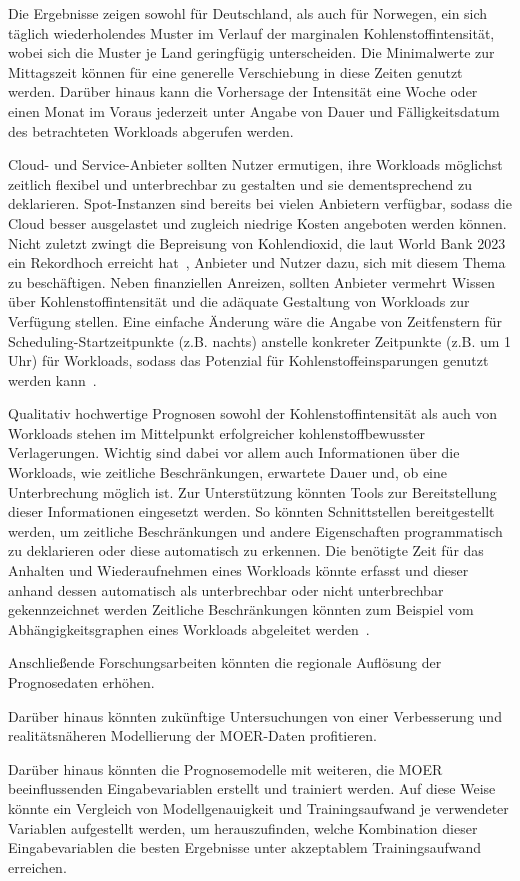 Die Ergebnisse zeigen sowohl für Deutschland, als auch für Norwegen, ein sich täglich wiederholendes Muster im Verlauf der marginalen Kohlenstoffintensität, wobei sich die Muster je Land geringfügig unterscheiden.
Die Minimalwerte zur Mittagszeit können für eine generelle Verschiebung in diese Zeiten genutzt werden.
Darüber hinaus kann die Vorhersage der Intensität eine Woche oder einen Monat im Voraus jederzeit unter Angabe von Dauer und Fälligkeitsdatum des betrachteten Workloads abgerufen werden.

Cloud- und Service-Anbieter sollten Nutzer ermutigen, ihre Workloads möglichst zeitlich flexibel und unterbrechbar zu gestalten und sie dementsprechend zu deklarieren.
Spot-Instanzen sind bereits bei vielen Anbietern verfügbar, sodass die Cloud besser ausgelastet und zugleich niedrige Kosten angeboten werden können.
Nicht zuletzt zwingt die Bepreisung von Kohlendioxid, die laut World Bank 2023 ein Rekordhoch erreicht hat~\cite{WorldBank.2023}, Anbieter und Nutzer dazu, sich mit diesem Thema zu beschäftigen.
Neben finanziellen Anreizen, sollten Anbieter vermehrt Wissen über Kohlenstoffintensität und die adäquate Gestaltung von Workloads zur Verfügung stellen.
Eine einfache Änderung wäre die Angabe von Zeitfenstern für Scheduling-Startzeitpunkte (z.B. nachts) anstelle konkreter Zeitpunkte (z.B. um 1 Uhr) für Workloads, sodass das Potenzial für Kohlenstoffeinsparungen genutzt werden kann~\cite{Wiesner.2021}.

Qualitativ hochwertige Prognosen sowohl der Kohlenstoffintensität als auch von Workloads stehen im Mittelpunkt erfolgreicher kohlenstoffbewusster Verlagerungen.
Wichtig sind dabei vor allem auch Informationen über die Workloads, wie zeitliche Beschränkungen, erwartete Dauer und, ob eine Unterbrechung möglich ist.
Zur Unterstützung könnten Tools zur Bereitstellung dieser Informationen eingesetzt werden.
So könnten Schnittstellen bereitgestellt werden, um zeitliche Beschränkungen und andere Eigenschaften programmatisch zu deklarieren oder diese automatisch zu erkennen.
Die benötigte Zeit für das Anhalten und Wiederaufnehmen eines Workloads könnte erfasst und dieser anhand dessen automatisch als unterbrechbar oder nicht unterbrechbar gekennzeichnet werden
Zeitliche Beschränkungen könnten zum Beispiel vom Abhängigkeitsgraphen eines Workloads abgeleitet werden~\cite{Wiesner.2021}.

Anschließende Forschungsarbeiten könnten die regionale Auflösung der Prognosedaten erhöhen.

Darüber hinaus könnten zukünftige Untersuchungen von einer Verbesserung und realitätsnäheren Modellierung der \ac{MOER}-Daten profitieren.

Darüber hinaus könnten die Prognosemodelle mit weiteren, die \ac{MOER} beeinflussenden Eingabevariablen erstellt und trainiert werden.
Auf diese Weise könnte ein Vergleich von Modellgenauigkeit und Trainingsaufwand je verwendeter Variablen aufgestellt werden, um herauszufinden, welche Kombination dieser Eingabevariablen die besten Ergebnisse unter akzeptablem Trainingsaufwand erreichen.


